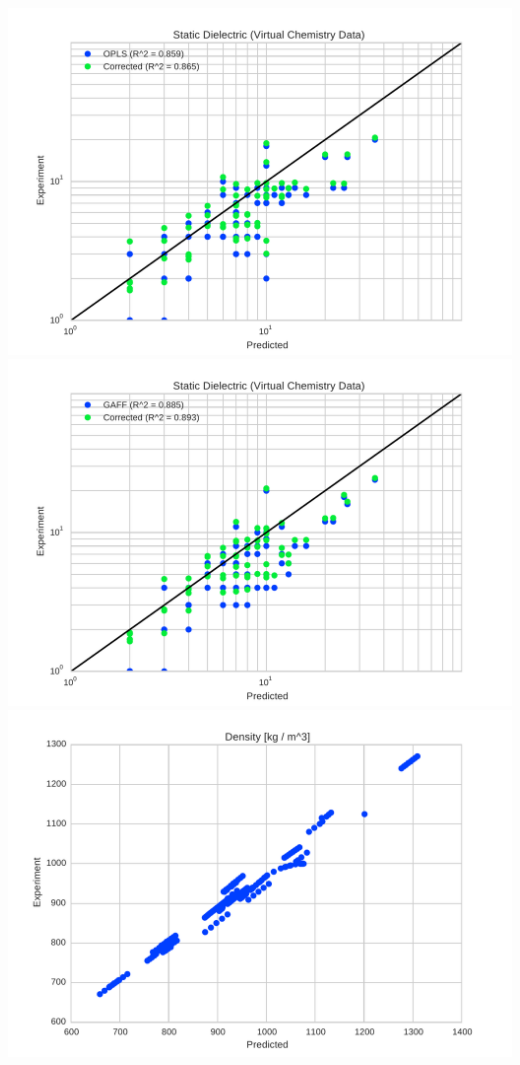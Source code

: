 \documentclass[aps,pre,twocolumn,superscriptaddress]{revtex4-1}
\begin{document}
\includegraphics[width=\columnwidth]{./figures/dielectric_virtual_chemistry_opls.pdf}
\includegraphics[width=\columnwidth]{./figures/dielectric_virtual_chemistry_gaff.pdf}
\includegraphics[width=\columnwidth]{./figures/densities_thermoml.pdf}
\end{document}
